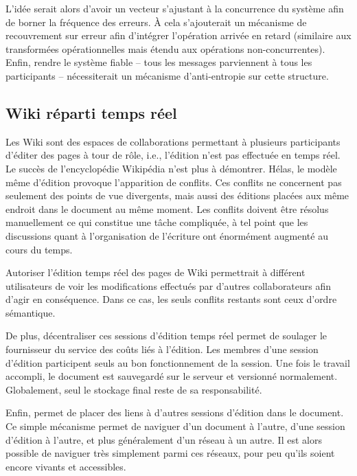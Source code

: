 L'idée serait alors d'avoir un vecteur s'ajustant à la concurrence du système
afin de borner la fréquence des erreurs. À cela s'ajouterait un mécanisme de
recouvrement sur erreur afin d'intégrer l'opération arrivée en retard (similaire
aux transformées opérationnelles mais étendu aux opérations non-concurrentes).
Enfin, rendre le système fiable -- tous les messages parviennent à tous les
participants -- nécessiterait un mécanisme d'anti-entropie sur cette structure.

\subsection{Wiki réparti temps réel}

Les Wiki sont des espaces de collaborations permettant à plusieurs participants
d'éditer des pages à tour de rôle, i.e., l'édition n'est pas effectuée en temps
réel. Le succès de l'encyclopédie Wikipédia n'est plus à démontrer. Hélas, le
modèle même d'édition provoque l'apparition de conflits. Ces conflits ne
concernent pas seulement des points de vue divergents, mais aussi des éditions
placées aux même endroit dans le document au même moment. Les conflits doivent
être résolus manuellement ce qui constitue une tâche compliquée, à tel point que
les discussions quant à l'organisation de l'écriture ont énormément augmenté au
cours du temps.

Autoriser l'édition temps réel des pages de Wiki permettrait à différent
utilisateurs de voir les modifications effectués par d'autres collaborateurs
afin d'agir en conséquence. Dans ce cas, les seuls conflits restants sont ceux
d'ordre sémantique.

De plus, décentraliser ces sessions d'édition temps réel permet de soulager le
fournisseur du service des coûts liés à l'édition. Les membres d'une session
d'édition participent seuls au bon fonctionnement de la session. Une fois le
travail accompli, le document est sauvegardé sur le serveur et versionné
normalement. Globalement, seul le stockage final reste de sa responsabilité.

Enfin, \CRATE permet de placer des liens à d'autres sessions d'édition dans le
document. Ce simple mécanisme permet de naviguer d'un document à l'autre, d'une
session d'édition à l'autre, et plus généralement d'un réseau à un autre. Il est
alors possible de naviguer très simplement parmi ces réseaux, pour peu qu'ils
soient encore vivants et accessibles.


